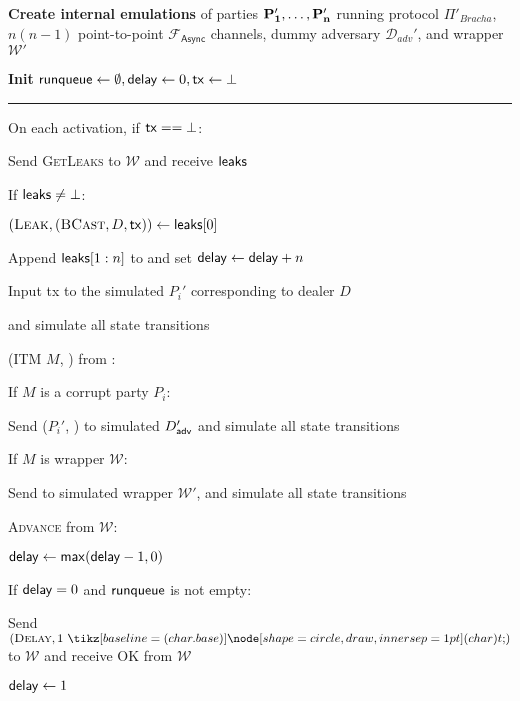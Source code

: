 \begin{bbox}[title={$\mathcal{S}_\mathsf{Bracha}$}]


\textbf{Create internal emulations} of parties $\bf{P_1'},\dots,\bf{P_n'}$ running protocol $\Pi'_{Bracha}$, $n(n-1)$ point-to-point $\mathcal{F}_\mathsf{Async}$ channels, dummy adversary $\mathcal{D}_{adv}'$, and wrapper $\mathcal{W}'$

\textbf{Init} ${\mathsf {runqueue}} \leftarrow \emptyset, {\mathsf {delay}} \leftarrow 0, {\mathsf {tx}} \leftarrow \bot$

\vspace{2mm} \hrule \vspace{2mm}

On each activation, if ${\mathsf {tx}} == \bot$:

    \quad Send \textsc{GetLeaks} to $\mathcal{W}$ and receive ${\mathsf {leaks}}$
    
    \quad If ${\mathsf {leaks}} \neq \bot$:
    
        \qquad $(\textsc{Leak}, (\textsc{BCast}, D, {\mathsf {tx}})) \leftarrow {\mathsf {leaks}}[0]$
        
        \qquad Append ${\mathsf {leaks}}[1:n]$ to  and set ${\mathsf {delay}} \leftarrow {\mathsf {delay}} + n$
        
        \qquad Input \textsf{tx} to the simulated $P_i'$ corresponding to dealer $D$ 
        
        \qquad and simulate all state transitions
        
\OnInput (ITM $M$, ) from \Env:

    \quad If $M$ is a corrupt party $P_i$:
    
        \qquad Send ($P_i'$, ) to simulated $D_{{\mathsf {adv}}}'$ and simulate all state transitions
        
    \quad If $M$ is wrapper $\mathcal{W}$:
    
    	\qquad Send  to simulated wrapper $\mathcal{W}'$, and simulate all state transitions 

\OnInput \textsc{Advance} from $\mathcal{W}$:

    \quad ${\mathsf {delay}} \leftarrow {\mathsf {max}}({\mathsf {delay}} - 1, 0)$
    
    \quad If ${\mathsf {delay}} = 0$ and ${\mathsf {runqueue}}$ is not empty:
    
        \qquad Send $(\textsc{Delay}, 1 \token)$ to $\mathcal{W}$ and receive \textsc{OK} from $\mathcal{W}$
        
        \qquad ${\mathsf {delay}} \leftarrow 1$
        

\end{bbox}
